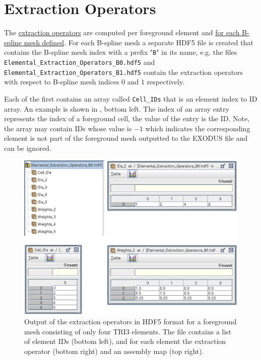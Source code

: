 \section{Extraction Operators}
\label{sec:tutorial_extraction_ops}

The \hyperref[eq:extraction_operator]{extraction operators} are computed per foreground element and \hyperlink{bspline_mesh_definition}{for each B-spline mesh defined}. For each B-spline mesh a separate HDF5 file is created that contains the B-spline mesh index with a prefix "\texttt{B}" in its name, 
\newline e.g. the files \texttt{Elemental\_Extraction\_Operators\_B0.hdf5} and
\newline \texttt{Elemental\_Extraction\_Operators\_B1.hdf5} contain the extraction operators with respect to B-spline mesh indices $0$ and $1$ respectively.

\vspace{0.2cm}

Each of the first contains an array called \texttt{Cell\_IDs} that is an element index to ID array. An example is shown in , bottom left. The index of an array entry represents the index of a foreground cell, the value of the entry is the ID. Note, the array may contain IDs whose value is $-1$ which indicates the corresponding element is not part of the foreground mesh outputted to the EXODUS file and can be ignored.

\begin{figure}[h]
    \vspace{0.5cm}
    \begin{center}
    \includegraphics[width=13cm]{Figures/extraction_operator_output.png}
    \caption{Output of the extraction operators in HDF5 format for a foreground mesh consisting of only four TRI3 elements. The file contains a list of element IDs (bottom left), and for each element the extraction operator (bottom right) and an assembly map (top right).} 
    \label{fig:extraction_operator_output}
    \end{center}
\end{figure}

